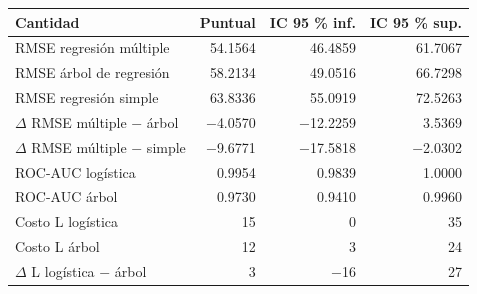 \begin{tabular}{lrrr}
\toprule
Cantidad & Puntual & IC 95 \% inf. & IC 95 \% sup. \\
\midrule
RMSE regresión múltiple & 54.1564 & 46.4859 & 61.7067 \\
RMSE árbol de regresión & 58.2134 & 49.0516 & 66.7298 \\
RMSE regresión simple & 63.8336 & 55.0919 & 72.5263 \\
$\Delta$ RMSE múltiple $-$ árbol & $-$4.0570 & $-$12.2259 & 3.5369 \\
$\Delta$ RMSE múltiple $-$ simple & $-$9.6771 & $-$17.5818 & $-$2.0302 \\
ROC-AUC logística & 0.9954 & 0.9839 & 1.0000 \\
ROC-AUC árbol & 0.9730 & 0.9410 & 0.9960 \\
Costo L logística & 15 & 0 & 35 \\
Costo L árbol & 12 & 3 & 24 \\
$\Delta$ L logística $-$ árbol & 3 & $-$16 & 27 \\
\bottomrule
\end{tabular}
